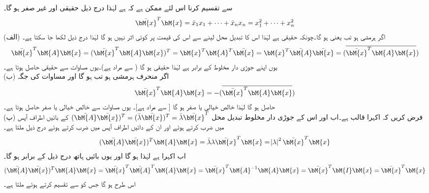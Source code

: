  سے تقسیم کرنا اس لئے ممکن ہے کہ  ہے لہٰذا درج ذیل حقیقی اور غیر صفر ہو گا۔
\begin{align*}
\bar{\bM{x}}^T\bM{x}=\bar{x}_1x_1+\cdots+\bar{x}_nx_n=x_1^2+\cdots+x_n^2
\end{align*}
(الف) اگر  ہرمشی ہو تب  یعنی  ہو گا۔چونکہ  حقیقی ہے لہٰذا اس کا تبدیل محل لینے سے اس کی قیمت پر کوئی اثر نہیں ہو گا لہٰذا درج ذیل لکھا جا سکتا ہے۔
\begin{align}\label{مساوات_آئگنی_مسئلہ_اقدار_ب}
\bar{\bM{x}}^T\bM{A}\bM{x}=(\bar{\bM{x}}^T\bM{A}\bM{x})^T=\bM{x}^T\bM{A}^T\bar{\bM{x}}=\bM{x}^T\bar{\bM{A}}\bar{\bM{x}}=(\overline{\bar{\bM{x}}^T\bM{A}\bM{x}})
\end{align} 
یوں  اپنے جوڑی دار مخلوط کے برابر ہے لہٰذا  حقیقی ہو گا ( سے مراد  ہے)۔یوں مساوات  سے  حقیقی حاصل ہوتا ہے۔\\
(ب) اگر  منحرف ہرمشی ہو تب  ہو گا اور مساوات  کی جگہ
\begin{align}\label{مساوات_آئگنی_مسئلہ_اقدار_پ}
\bar{\bM{x}}^T\bM{A}\bM{x}=-(\overline{\bar{\bM{x}}^T\bM{A}\bM{x}})
\end{align}
حاصل ہو گا لہٰذا  خالص خیالی یا صفر  ہو گا [ سے مراد  ہے]۔ یوں مساوات  سے  خالص خیالی یا صفر  حاصل ہوتا ہے۔\\
(پ) فرض کریں کہ  اکہرا  قالب ہے۔اب  اور اس کے جوڑی دار مخلوط تبدیل محل 
$(\bar{\bM{A}}\bar{\bM{x}})^T=(\bar{\lambda}\bar{\bM{x}})^T=\bar{\lambda}\bar{\bM{x}}^T$
کے بائیں اطراف آپس میں ضرب کرتے ہوئے اور ان کے دائیں اطراف آپس میں ضرب کرتے ہوئے درج ذیل ملتا ہے۔
\begin{align*}
(\bar{\bM{A}}\bar{\bM{x}})^T\bM{A}\bM{x}=\bar{\lambda}\lambda\bar{\bM{x}}^T\bM{x}=\abs{\lambda}^2\bar{\bM{x}}^T\bM{x}
\end{align*}
اب  اکہرا ہے لہٰذا  ہو گا اور یوں بائیں ہاتھ درج ذیل کے برابر ہو گا۔
\begin{align*}
(\bar{\bM{A}}\bar{\bM{x}})^T\bM{A}\bM{x}=\bar{\bM{x}}^T\bar{\bM{A}}^T\bM{A}\bM{x}=\bar{\bM{x}}^T\bM{A}^{-1}\bM{A}\bM{x}=\bar{\bM{x}}^T\bM{I}\bM{x}=\bar{\bM{x}}^T\bM{x}
\end{align*}
اس طرح  ہو گا جس کو  سے تقسیم کرتے ہوئے  ملتا ہے۔

